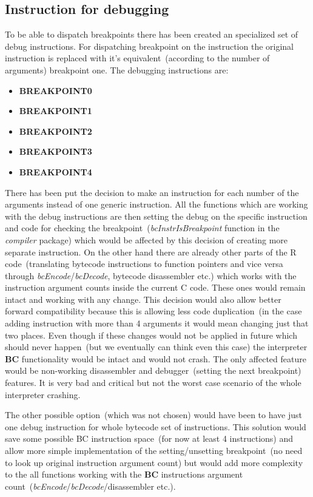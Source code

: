 \documentclass[thesis=M,english]{FITthesis}[2018/10/20]
\begin{document}
\subsection{Instruction for debugging}\label{instruction-for-debugging}

To be able to dispatch breakpoints there has been created an specialized set of debug instructions. For dispatching breakpoint on the instruction the original instruction is replaced with it's equivalent~(according to the number of arguments) breakpoint one. The debugging instructions are:

\begin{itemize}
	\item \textbf{BREAKPOINT0}
	\item \textbf{BREAKPOINT1}
	\item \textbf{BREAKPOINT2}
	\item \textbf{BREAKPOINT3}
	\item \textbf{BREAKPOINT4}
\end{itemize}

There has been put the decision to make an instruction for each number of the arguments instead of one generic instruction. All the functions which are working with the debug instructions are then setting the debug on the specific instruction and code for checking the breakpoint~(\textit{bcInstrIsBreakpoint} function in the \textit{compiler} package) which would be affected by this decision of creating more separate instruction. On the other hand there are already other parts of the R code~(translating bytecode instructions to function pointers and vice versa through \textit{bcEncode}/\textit{bcDecode}, bytecode disassembler etc.) which works with the instruction argument counts inside the current C code. These ones would remain intact and working with any change. This decision would also allow better forward compatibility because this is allowing less code duplication~(in the case adding instruction with more than 4 arguments it would mean changing just that two places. Even though if these changes would not be applied in future which should never happen~(but we eventually can think even this case) the interpreter \textbf{BC} functionality would be intact and would not crash. The only affected feature would be non-working disassembler and debugger~(setting the next breakpoint) features. It is very bad and critical but not the worst case scenario of the whole interpreter crashing.

The other possible option~(which was not chosen) would have been to have just one debug instruction for whole bytecode set of instructions. This solution would save some possible BC instruction space~(for now at least 4 instructions) and allow more simple implementation of the setting/unsetting breakpoint~(no need to look up original instruction argument count) but would add more complexity to the all functions working with the \textbf{BC} instructions argument count~(\textit{bcEncode}/\textit{bcDecode}/disassembler etc.).
\end{document}
